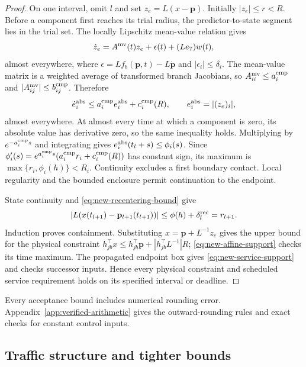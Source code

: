\documentclass[final]{cas-sc}
\theoremstyle{definition}
\theoremstyle{plain}
\theoremstyle{definition}
\theoremstyle{plain}
\newcommand{\appref}[1]{Appendix~\ref{#1}}
\begin{document}
\begin{proof}
On one interval, omit $l$ and set $z_e=L(x-\mathbf p)$. Initially
$|z_e|\le r<R$. Before a component first reaches its trial radius, the
predictor-to-state segment lies in the trial set. The locally Lipschitz
mean-value relation \cite{clarke1990optimization} gives
\begin{equation}
\dot z_e=A^{\rm mv}(t)z_e+\epsilon(t)+(Le_7)w(t),
\label{eq:new-error-dynamics}
\end{equation}
almost everywhere, where
$\epsilon=Lf_b(\mathbf p,t)-L\dot{\mathbf p}$ and
$|\epsilon_i|\le\delta_i$. The mean-value matrix is a weighted average
of transformed branch Jacobians, so
$A_{ii}^{\rm mv}\le a_i^{\rm cmp}$ and
$|A_{ij}^{\rm mv}|\le b_{ij}^{\rm cmp}$. Therefore
\begin{equation}
\dot e_i^{\rm abs}\le a_i^{\rm cmp}e_i^{\rm abs}+c_i^{\rm cmp}(R),
\qquad e_i^{\rm abs}=|(z_e)_i|,
\label{eq:new-error-comparison-proof}
\end{equation}
almost everywhere. At almost every time at which a component is zero,
its absolute value has derivative zero, so the same inequality holds.
Multiplying by $e^{-a_i^{\rm cmp}s}$ and integrating gives
$e_i^{\rm abs}(t_l+s)\le\phi_i(s)$. Since
$\phi_i'(s)=e^{a_i^{\rm cmp}s}(a_i^{\rm cmp}r_i+c_i^{\rm cmp}(R))$ has
constant sign, its maximum is $\max\{r_i,\phi_i(h)\}<R_i$. Continuity
excludes a first boundary contact. Local regularity and the bounded
enclosure permit continuation to the endpoint.

State continuity and \eqref{eq:new-recentering-bound} give
\[
|L(x(t_{l+1})-\mathbf p_{l+1}(t_{l+1}))|
\le\phi(h)+\delta_l^{\rm rec}=r_{l+1}.
\]
Induction proves containment. Substituting
$x=\mathbf p+L^{-1}z_e$ gives the upper bound for the physical
constraint
$h_{jb}^\top x\le h_{jb}^\top\mathbf p+|h_{jb}^\top L^{-1}|R$;
\eqref{eq:new-affine-support} checks its time maximum. The propagated
endpoint box gives \eqref{eq:new-service-support} and checks successor
inputs. Hence every physical constraint and scheduled service
requirement holds on its specified interval or deadline.
\end{proof}

Every acceptance bound includes numerical rounding error.
\appref{app:verified-arithmetic} gives the outward-rounding rules and
exact checks for constant control inputs.

\subsection{Traffic structure and tighter bounds}
\label{sec:structure-certificate}
\label{app:structure-proof}
\end{document}
